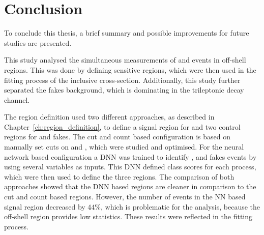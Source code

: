 \documentclass[bachelor,oneside, BCOR10mm,
			ngerman,english  %
]{GAUBM}
\begin{document}
%	
%	

\chapter{Conclusion}
\label{ch:conclusion}
To conclude this thesis, a brief summary and possible improvements for future studies are presented.

This study analysed the simultaneous measurements of \ttbarZ and \ttbarW events in off-shell regions. This was done by defining sensitive regions, which were then used in the fitting process of the inclusive cross-section. Additionally, this study further separated the fakes background, which is dominating in the trileptonic decay channel. 

The region definition used two different approaches, as described in Chapter~\ref{ch:region_definition}, to define a signal region for \ttbarZ and two control regions for \ttbarW and fakes. The cut and count based configuration is based on manually set cuts on \ETMiss and \dR, which were studied and optimised. For the neural network based configuration a DNN was trained to identify \ttbarZ, \ttbarW and fakes events by using several variables as inputs. This DNN defined class scores for each process, which were then used to define the three regions. The comparison of both approaches showed that the DNN based regions are cleaner in comparison to the cut and count based regions. However, the number of events in the NN based signal region decreased by $44\%$, which is problematic for the analysis, because the off-shell region provides low statistics. These results were reflected in the fitting process.
\end{document}
